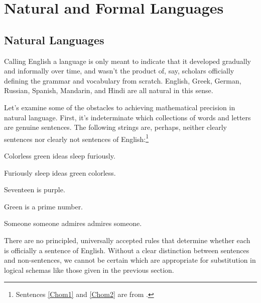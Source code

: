 \section{Natural and Formal Languages}\label{Preliminaries}
\subsection{Natural Languages}\label{Natural Languages}

Calling English a  language is only meant to indicate that it developed gradually and informally over time, and wasn't the product of, say, scholars officially defining the grammar and vocabulary from scratch. 
English, Greek, German, Russian, Spanish, Mandarin, and Hindi are all natural in this sense. 

Let's examine some of the obstacles to achieving mathematical precision in natural language. 
First, it's indeterminate which collections of words and letters are genuine sentences. 
The following strings are, perhaps, neither clearly sentences nor clearly not sentences of English:\footnote{Sentences \ref{Chom1} and \ref{Chom2} are from \citealp{Chomsky1957}.}
\begin{menumerate}
\item\label{Chom1} Colorless green ideas sleep furiously. 
\item\label{Chom2} Furiously sleep ideas green colorless. 
\item Seventeen is purple.
\item Green is a prime number.
\item Someone someone admires admires someone.
\end{menumerate}
There are no principled, universally accepted rules that determine whether each is officially a sentence of English. 
Without a clear distinction between sentences and non-sentences, we cannot be certain which are appropriate for substitution in logical schemas like those given in the previous section.

